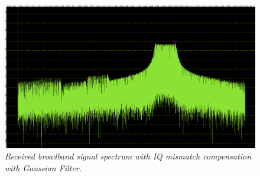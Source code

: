 \documentclass[en,printmode]{mgr}
\begin{document}
   		\begin{figure}[H]
    		\centering
   			\includegraphics[width=\textwidth]{plots/my_band_gauss.png}
   		 	\caption{\textit{Received broadband signal spectrum with IQ mismatch compensation with
   		 	Gaussian Filter.}}
   		\end{figure}
   		
\end{document}
